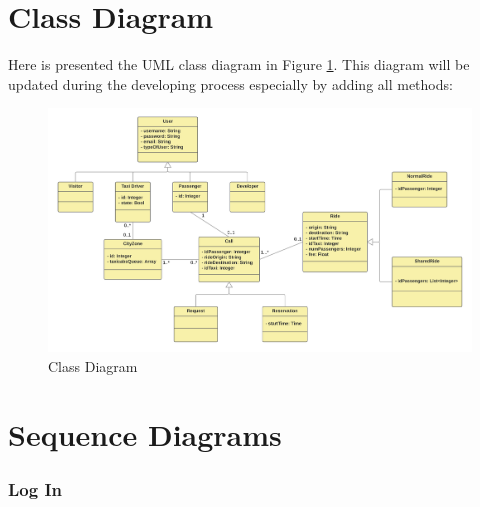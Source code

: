 \section{Class Diagram}
Here is presented the UML class diagram in Figure \ref{fig:classdiag}. This diagram will be updated during the developing process especially by adding all methods:

\begin{landscape}
\begin{figure}[h]
\centering
\includegraphics[width=\paperwidth]{cpt/img/ClassDiagram}
\caption{Class Diagram}
\label{fig:classdiag}
\end{figure}
\end{landscape}

\section{Sequence Diagrams}

\subsubsection{Log In}

